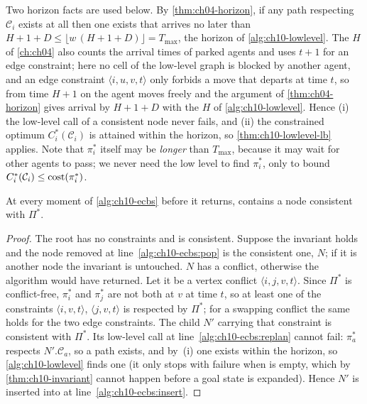 Two horizon facts are used below. By \cref{thm:ch04-horizon}, if any path
respecting $\mathcal{C}_i$ exists at all then one exists that arrives no later
than $H + 1 + D \le \lfloor w\,(H + 1 + D)\rfloor = T_{\max}$, the horizon of
\cref{alg:ch10-lowlevel}. The $H$ of \cref{ch:ch04} also counts the arrival
times of parked agents and uses $t + 1$ for an edge constraint; here no cell
of the low-level graph is blocked by another agent, and an edge constraint
$\langle i, u, v, t\rangle$ only forbids a move that departs at time $t$, so
from time $H + 1$ on the agent moves freely and the argument of
\cref{thm:ch04-horizon} gives arrival by $H + 1 + D$ with the $H$ of
\cref{alg:ch10-lowlevel}. Hence (i) the low-level call of a consistent node
never fails, and (ii) the constrained optimum $C_i^*(\mathcal{C}_i)$ is
attained within the horizon, so \cref{thm:ch10-lowlevel-lb} applies. Note that
$\pi_i^*$ itself may be \emph{longer} than $T_{\max}$, because it may wait for
other agents to pass; we never need the low level to find $\pi_i^*$, only to
bound $C_i^*(\mathcal{C}_i) \le \operatorname{cost}(\pi_i^*)$.

\begin{lemma}
\label{thm:ch10-consistent}
At every moment of \cref{alg:ch10-ecbs} before it returns, \Open contains a
node consistent with $\Pi^*$.
\end{lemma}
\begin{proof}
The root has no constraints and is consistent. Suppose the invariant holds
and the node removed at line~\ref{alg:ch10-ecbs:pop} is the consistent one,
$N$; if it is another node the invariant is untouched. $N$ has a conflict,
otherwise the algorithm would have returned. Let it be a vertex conflict
$\langle i, j, v, t\rangle$. Since $\Pi^*$ is conflict-free, $\pi_i^*$ and
$\pi_j^*$ are not both at $v$ at time $t$, so at least one of the constraints
$\langle i, v, t\rangle$, $\langle j, v, t\rangle$ is respected by $\Pi^*$;
for a swapping conflict the same holds for the two edge constraints. The
child $N'$ carrying that constraint is consistent with $\Pi^*$. Its low-level
call at line~\ref{alg:ch10-ecbs:replan} cannot fail: $\pi_a^*$ respects
$N'.\mathcal{C}_a$, so a path exists, and by~(i) one exists within the
horizon, so \cref{alg:ch10-lowlevel} finds one (it only stops with failure when \Open is
empty, which by \cref{thm:ch10-invariant} cannot happen before a goal state
is expanded). Hence $N'$ is inserted into \Open at
line~\ref{alg:ch10-ecbs:insert}.
\end{proof}

